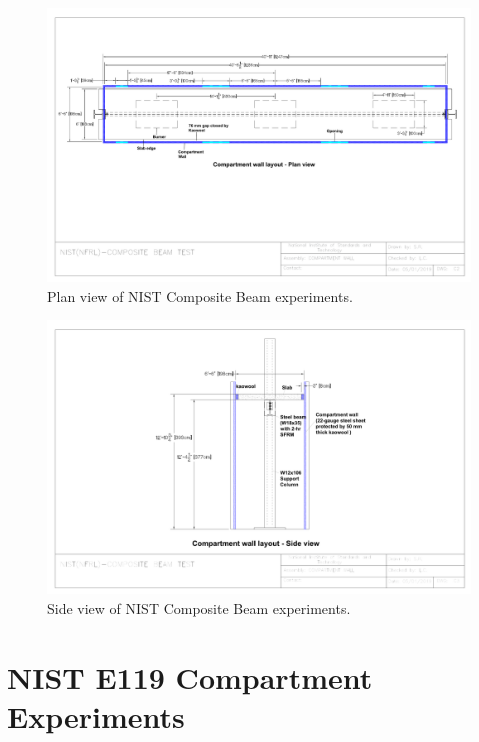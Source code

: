 \begin{figure}
\includegraphics[width=\textwidth]{FIGURES/NIST_Composite_Beam/NFRL_CompositeBeamTest_CompartmentWallLayout_2}
\caption[Plan view of NIST Composite Beam experiments]{Plan view of NIST Composite Beam experiments.}
\label{NIST_Composite_Beam_Drawing_2}
\end{figure}

\begin{figure}
\includegraphics[width=\textwidth]{FIGURES/NIST_Composite_Beam/NFRL_CompositeBeamTest_CompartmentWallLayout_3}
\caption[Side view of NIST Composite Beam experiments]{Side view of NIST Composite Beam experiments.}
\label{NIST_Composite_Beam_Drawing_3}
\end{figure}

\section{NIST E119 Compartment Experiments}
\label{NIST_E119_Compartment_Description}

